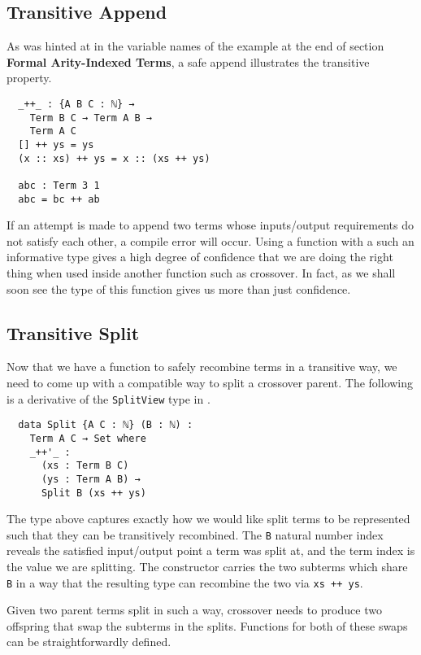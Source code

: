 \documentclass{acm_proc_article-sp}
\begin{document}
\subsection{Transitive Append}

As was hinted at in the variable names of the example at the end of
section \textbf{Formal Arity-Indexed Terms}, a safe append illustrates
the transitive property. 

\begin{verbatim}
  _++_ : {A B C : ℕ} →
    Term B C → Term A B →
    Term A C
  [] ++ ys = ys
  (x :: xs) ++ ys = x :: (xs ++ ys)

  abc : Term 3 1
  abc = bc ++ ab
\end{verbatim}

If an attempt is made to append two terms whose inputs/output
requirements do not satisfy each other, a compile error will
occur. Using a function with a such an informative type gives a high
degree of confidence that we are doing the right thing when used
inside another function such as crossover. In fact, as we shall soon
see the type of this function gives us more than just confidence.

\subsection{Transitive Split}

Now that we have a function to safely recombine terms in a transitive
way, we need to come up with a compatible way to split a crossover
parent. The following is a derivative of the \texttt{SplitView} type
in \cite{oury:tpop}.

\begin{verbatim}
  data Split {A C : ℕ} (B : ℕ) :
    Term A C → Set where
    _++'_ :
      (xs : Term B C)
      (ys : Term A B) →
      Split B (xs ++ ys)
\end{verbatim}

The type above captures exactly how we would like split terms to be
represented such that they can be transitively recombined. The
\texttt{B} natural number index reveals the satisfied
input/output point a term was split at, and the term index is the
value we are splitting. The constructor carries the two
subterms which share \texttt{B} in a way that the resulting type can
recombine the two via \texttt{xs ++ ys}.

Given two parent terms split in such a way, crossover needs to produce
two offspring that swap the subterms in the splits. Functions for both
of these swaps can be straightforwardly defined.
\end{document}
